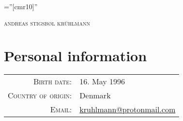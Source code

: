 \documentclass[a4paper,10pt]{article}
\begin{document}
\pagestyle{empty} %

\font\fb=''[cmr10]'' %

\par{\centering
		{\Huge \textsc{andreas stigsb\o l kr\"uhlmann}
	}\bigskip\par}

\section{Personal information}

\begin{tabular}{rl}
    \textsc{Birth date:} & 16. May 1996\\
    \textsc{Country of origin:}     & Denmark\\
    \textsc{Email:}       & \href{mailto:kruhlmann@protonmail.com}{kruhlmann@protonmail.com}
\end{tabular}

\end{document}
